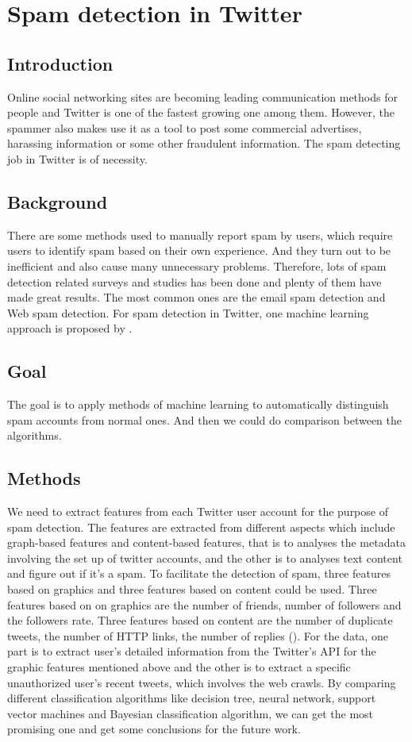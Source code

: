 \documentclass[../proposal.tex]{subfiles}
\begin{document}
\section{Spam detection in Twitter}

\subsection{Introduction}

Online social networking sites are becoming leading communication methods for people and Twitter is one of the fastest growing one among them. However, the spammer also makes use it as a tool to post some commercial advertises, harassing information or some other fraudulent information. The spam detecting job in Twitter is of necessity.

\subsection{Background}
There are some methods used to manually report spam by users, which require
users to identify spam based on their own experience. And they turn out to be
inefficient and also cause many unnecessary problems. Therefore, lots of spam
detection related surveys and studies has been done and plenty of them have
made great results. The most common ones are the email spam detection and Web
spam detection. For spam detection in Twitter, one machine learning approach is
proposed by \cite{wang2010detecting}.

\subsection{Goal}
The goal is to apply methods of machine learning to automatically distinguish
spam accounts from normal ones. And then we could do comparison between the
algorithms.



\subsection{Methods}
We need to extract features from each Twitter user account for the purpose of
spam detection. The features are extracted from different aspects which include
graph-based features and content-based features, that is to analyses the
metadata involving the set up of twitter accounts, and the other is to analyses
text content and figure out if it’s a spam. To facilitate the detection of
spam,  three features based on graphics and three features based on content
could be used. Three features based on on graphics are the number of friends,
number of followers and the followers rate. Three features based on content are
the number of duplicate tweets, the number of HTTP links, the number of
replies (\cite{wang2010don}). For the data, one part is to extract user's
detailed information from the Twitter's API for the graphic features mentioned
above and the other is to extract a specific unauthorized user's recent tweets,
which involves the web crawls. By comparing different classification algorithms
like decision tree, neural network, support vector machines and Bayesian
classification algorithm, we can get the most promising one and get some
conclusions for the future work.
\end{document}
